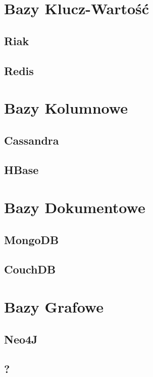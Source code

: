 \section{Bazy Klucz-Wartość}

\subsection{Riak}
\label{sec:riak}

\subsection{Redis}
\label{sec:redis}

\section{Bazy Kolumnowe}

\subsection{Cassandra}
\label{sec:cassandra}

\subsection{HBase}
\label{sec:hbase}

\section{Bazy Dokumentowe}

\subsection{MongoDB}
\label{sec:mongodb}

\subsection{CouchDB}
\label{sec:couchdb}

\section{Bazy Grafowe}

\subsection{Neo4J}
\label{sec:neo4j}

\subsection{?}
